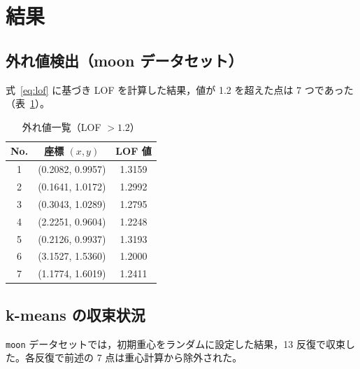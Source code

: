\documentclass[a4j,dvipdfmx]{jsarticle}
\begin{document}
\section{結果}
\subsection{外れ値検出（moon データセット）}
式~\eqref{eq:lof} に基づき LOF を計算した結果，値が 1.2 を超えた点は 7 つであった（表~\ref{tab:outliers}）。

\begin{table}[tbp]
  \centering
  \caption{外れ値一覧（LOF $>1.2$）}
  \label{tab:outliers}
  \begin{tabular}{ccc}
    \toprule
    No. & 座標 $(x,y)$ & LOF 値 \\
    \midrule
    1 & (0.2082, 0.9957) & 1.3159 \\
    2 & (0.1641, 1.0172) & 1.2992 \\
    3 & (0.3043, 1.0289) & 1.2795 \\
    4 & (2.2251, 0.9604) & 1.2248 \\
    5 & (0.2126, 0.9937) & 1.3193 \\
    6 & (3.1527, 1.5360) & 1.2000 \\
    7 & (1.1774, 1.6019) & 1.2411 \\
    \bottomrule
  \end{tabular}
\end{table}

\subsection{k-means の収束状況}
\texttt{moon} データセットでは，初期重心をランダムに設定した結果，13 反復で収束した。各反復で前述の 7 点は重心計算から除外された。
\end{document}
